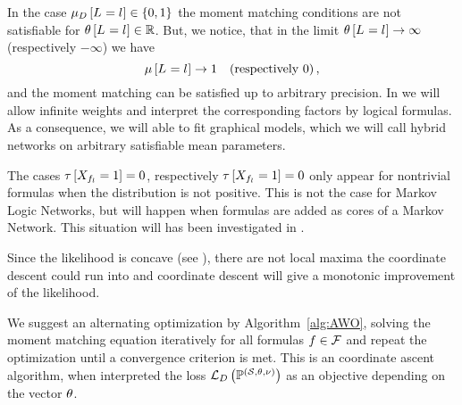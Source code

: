 In the case $\mu_{D}\left[L_{}=l_{}\right]\in\{0,1\}$ the moment matching conditions are not satisfiable for $\theta\left[L_{}=l_{}\right]\in\mathbb{R}$.
But, we notice, that in the limit $\theta\left[L_{}=l_{}\right]\rightarrow \infty $ (respectively $-\infty$) we have
	\[ \mu\left[L_{}=l_{}\right] \rightarrow  1 \quad \text{(respectively $0$)}\, ,  \]
and the moment matching can be satisfied up to arbitrary precision.
In  we will allow infinite weights and interpret the corresponding factors by logical formulas.
As a consequence, we will able to fit graphical models, which we will call hybrid networks on arbitrary satisfiable mean parameters.

%
The cases $\tau\left[X_{f_{l}}=1\right]=0$, respectively $\tau\left[X_{f_{l}}=1\right]=0$ only appear for nontrivial formulas when the distribution is not positive.
This is not the case for Markov Logic Networks, but will happen when formulas are added as cores of a Markov Network.
This situation will has been investigated in .


Since the likelihood is concave (see \cite{koller_probabilistic_2009}), there are not local maxima the coordinate descent could run into and coordinate descent will give a monotonic improvement of the likelihood.

We suggest an alternating optimization by Algorithm~\ref{alg:AWO}, solving the moment matching equation iteratively for all formulas $f\in\mathcal{F}$ and repeat the optimization until a convergence criterion is met.
This is an coordinate ascent algorithm, when interpreted the loss $\mathcal{L}_{D}\left(\mathbb{P}^{(\mathcal{S},\theta,\nu)}\right)$ as an objective depending on the vector $\theta$.

